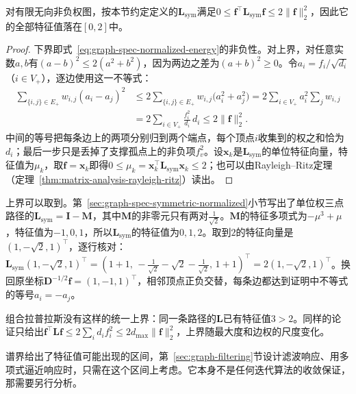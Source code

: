 \begin{theorem}[归一化谱界]
\label{thm:graph-spec-normalized-bound}
对有限无向非负权图，按本节约定定义的$\bm L_{\mathrm{sym}}$满足$0\leq\bm f^{\top}\bm L_{\mathrm{sym}}\bm f\leq2\lVert\bm f\rVert_2^2$，因此它的全部特征值落在$[0,2]$中。
\end{theorem}

\begin{proof}
下界即式~\eqref{eq:graph-spec-normalized-energy}的非负性。对上界，对任意实数$a,b$有$(a-b)^2\leq2(a^2+b^2)$，因为两边之差为$(a+b)^2\geq0$。令$a_i=f_i/\sqrt{d_i}$（$i\in V_+$），逐边使用这一不等式：
\[
 \begin{aligned}
 \sum_{\{i,j\}\in E_+}w_{i,j}(a_i-a_j)^2
 &\leq2\sum_{\{i,j\}\in E_+}w_{i,j}\bigl(a_i^2+a_j^2\bigr)
 =2\sum_{i\in V_+}a_i^2\sum_jw_{i,j}\\
 &=2\sum_{i\in V_+}\frac{f_i^2}{d_i}\,d_i\leq2\lVert\bm f\rVert_2^2 .
 \end{aligned}
\]
中间的等号把每条边上的两项分别归到两个端点，每个顶点$i$收集到的权之和恰为$d_i$；最后一步只是丢掉了支撑孤点上的非负项$f_v^2$。设$\bm x_k$是$\bm L_{\mathrm{sym}}$的单位特征向量，特征值为$\mu_k$，取$\bm f=\bm x_k$即得$0\leq\mu_k=\bm x_k^{\top}\bm L_{\mathrm{sym}}\bm x_k\leq2$；也可以由Rayleigh--Ritz定理（定理~\ref{thm:matrix-analysis-rayleigh-ritz}）读出。
\end{proof}

上界可以取到。第~\ref{sec:graph-spec-symmetric-normalized}小节写出了单位权三点路径的$\bm L_{\mathrm{sym}}=\bm I-\bm M$，其中$\bm M$的非零元只有两对$\tfrac1{\sqrt2}$。$\bm M$的特征多项式为$-\mu^3+\mu$，特征值为$-1,0,1$，所以$\bm L_{\mathrm{sym}}$的特征值为$0,1,2$。取到$2$的特征向量是$(1,-\sqrt2,1)^{\top}$，逐行核对：$\bm L_{\mathrm{sym}}(1,-\sqrt2,1)^{\top}=(1+1,\,-\tfrac1{\sqrt2}-\sqrt2-\tfrac1{\sqrt2},\,1+1)^{\top}=2(1,-\sqrt2,1)^{\top}$。换回原坐标$\bm D^{-1/2}\bm f=(1,-1,1)^{\top}$，相邻顶点正负交替，每条边都达到证明中不等式的等号$a_i=-a_j$。

组合拉普拉斯没有这样的统一上界：同一条路径的$\bm L$已有特征值$3>2$。同样的论证只给出$\bm f^{\top}\bm L\bm f\leq2\sum_id_if_i^2\leq2d_{\max}\lVert\bm f\rVert_2^2$，上界随最大度和边权的尺度变化。

谱界给出了特征值可能出现的区间，第~\ref{sec:graph-filtering}节设计滤波响应、用多项式逼近响应时，只需在这个区间上考虑。它本身不是任何迭代算法的收敛保证，那需要另行分析。
